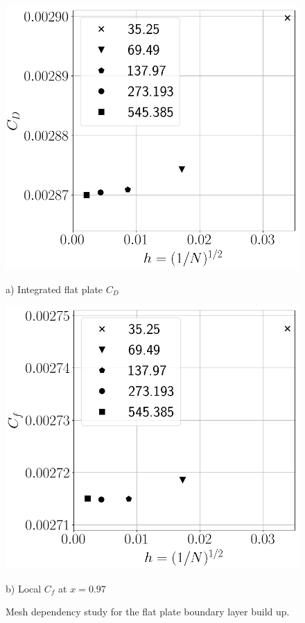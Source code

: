 \begin{figure}[H]
  \centering
  \begin{minipage}{0.45\columnwidth}
  \includegraphics[width=1.\textwidth]{figures/FPconvstudy.png}
    \caption*{a) Integrated flat plate $C_D$}
  \end{minipage}
  \begin{minipage}{0.45\columnwidth}
  \includegraphics[width=1.\textwidth]{figures/FPconvstudyCF.png}
    \caption*{b) Local $C_f$ at $x=0.97$}
  \end{minipage}
  \caption{Mesh dependency study for the flat plate boundary layer build up.} \label{fig:FPconstudy}
\end{figure}
